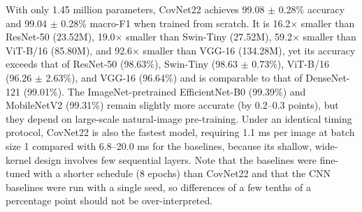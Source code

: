 \documentclass[a4paper,fleqn]{cas-sc}
\begin{document}
\begin{table}[!htbp]
\centering
\caption{Comparison with CNN and Vision Transformer baselines on the official Dataset-3 test set. Baselines: ImageNet-pretrained, fine-tuned for 8 epochs (Adam, learning rate $10^{-4}$, horizontal-flip augmentation), final-epoch weights; CNN baselines single run, transformers mean $\pm$ SD over three seeds. CovNet22: trained from scratch, mean $\pm$ SD over three seeds (Section~\ref{sec:dup_audit}). Latency: batch size 1, FP32, RTX 3060, identical timing protocol for all models.}
\label{tab:baselines}
\small
{}
\end{table}

With only 1.45 million parameters, CovNet22 achieves 99.08 $\pm$ 0.28\% accuracy and 99.04 $\pm$ 0.28\% macro-F1 when trained from scratch. It is 16.2$\times$ smaller than ResNet-50 (23.52M), 19.0$\times$ smaller than Swin-Tiny (27.52M), 59.2$\times$ smaller than ViT-B/16 (85.80M), and 92.6$\times$ smaller than VGG-16 (134.28M), yet its accuracy exceeds that of ResNet-50 (98.63\%), Swin-Tiny (98.63 $\pm$ 0.73\%), ViT-B/16 (96.26 $\pm$ 2.63\%), and VGG-16 (96.64\%) and is comparable to that of DenseNet-121 (99.01\%). The ImageNet-pretrained EfficientNet-B0 (99.39\%) and MobileNetV2 (99.31\%) remain slightly more accurate (by 0.2--0.3 points), but they depend on large-scale natural-image pre-training. Under an identical timing protocol, CovNet22 is also the fastest model, requiring 1.1 ms per image at batch size 1 compared with 6.8--20.0 ms for the baselines, because its shallow, wide-kernel design involves few sequential layers. Note that the baselines were fine-tuned with a shorter schedule (8 epochs) than CovNet22 and that the CNN baselines were run with a single seed, so differences of a few tenths of a percentage point should not be over-interpreted.
\end{document}
